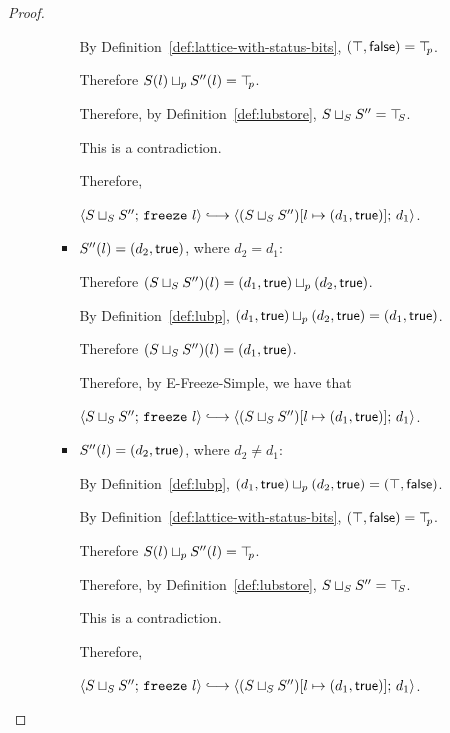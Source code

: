 \begin{proof}
\begin{itemize}
\begin{itemize}
\begin{itemize}
          By Definition~\ref{def:lattice-with-status-bits},
          $(\top, \textsf{false}) = \top\hspace{-0.85mm}_{p}$.

          Therefore $S(l) \sqcup_p S''(l) = \top\hspace{-0.85mm}_{p}$.

          Therefore, by Definition~\ref{def:lubstore},
          $S \sqcup_{S} S'' = \top\hspace{-0.85mm}_{S}$.

          This is a contradiction.

          Therefore,

          $\config{\lubstore{S}{S''}}{\freeze{l}}
          \parstepsto
          \config{\extS{(\lubstore{S}{S''})}{l}{d_1}{\frozentrue}}{d_1}$.

        \item $S''(l) = (d_2, \textsf{true})$, where $d_2 = d_1$:

          Therefore $(S \sqcup_{S} S'')(l) =
          (d_1, \textsf{true}) \sqcup_p (d_2, \textsf{true})$.

          By Definition~\ref{def:lubp},
          $(d_1, \textsf{true}) \sqcup_p (d_2, \textsf{true}) =
          (d_1, \textsf{true})$.

          Therefore $(S \sqcup_{S} S'')(l) =
          (d_1, \textsf{true})$.

          Therefore, by {\sc E-Freeze-Simple}, we have that

          $\config{\lubstore{S}{S''}}{\freeze{l}}
          \parstepsto
          \config{\extS{(\lubstore{S}{S''})}{l}{d_1}{\frozentrue}}{d_1}$.

        \item $S''(l) = (d_2, \textsf{true})$, where $d_2 \neq d_1$:

          By Definition~\ref{def:lubp},
          $(d_1, \textsf{true}) \sqcup_p (d_2, \textsf{true})
          = (\top, \textsf{false})$.

          By Definition~\ref{def:lattice-with-status-bits},
          $(\top, \textsf{false}) = \top\hspace{-0.85mm}_{p}$.

          Therefore $S(l) \sqcup_p S''(l) = \top\hspace{-0.85mm}_{p}$.

          Therefore, by Definition~\ref{def:lubstore},
          $S \sqcup_{S} S'' = \top\hspace{-0.85mm}_{S}$.

          This is a contradiction.

          Therefore,

          $\config{\lubstore{S}{S''}}{\freeze{l}}
          \parstepsto
          \config{\extS{(\lubstore{S}{S''})}{l}{d_1}{\frozentrue}}{d_1}$.
        \end{itemize}
      \end{itemize}


\end{itemize}
\end{proof}
